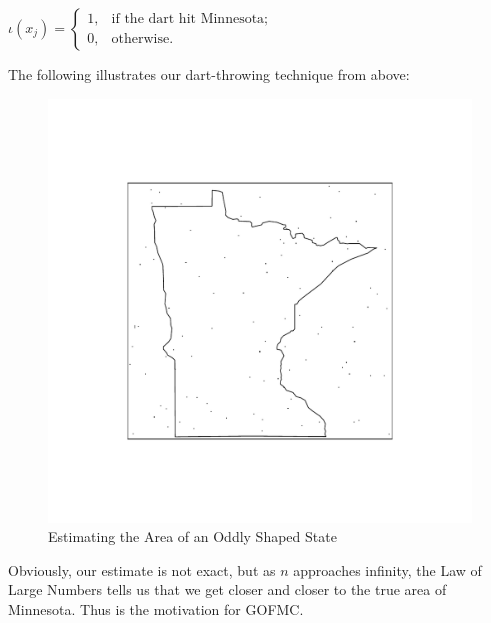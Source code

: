 \documentclass[12pt,twoside]{reedthesis}
\begin{document}
			\begin{center}
		 	$\iota(x_j) = 
			\begin{cases} 1, & \text{if the dart hit Minnesota}; \\
			0, & \text{otherwise}. \end{cases}$
			 \end {center}
			The following illustrates our dart-throwing technique from above:
			
			\begin{figure}[h]
		       	\centering
		    	\includegraphics[clip=true, viewport=.3in 1in 6in 6in,scale=0.5]{mn_box_pts}
		     	\caption{Estimating the Area of an Oddly Shaped State}
	 		\label{subd}
			\end{figure}	

			Obviously, our estimate is not exact, but as $n$ approaches infinity, the Law of Large Numbers tells us that we get closer and closer to the true area of Minnesota. Thus is the motivation for GOFMC.
\end{document}

